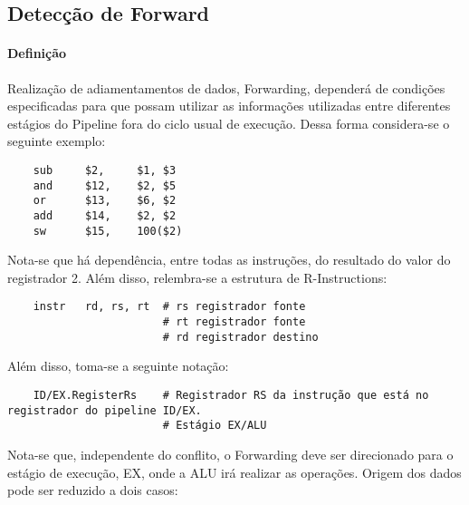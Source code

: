 \documentclass{article}
\begin{document}
\subsection{Detecção de Forward}
\paragraph{Definição}Realização de adiamentamentos de dados, Forwarding, dependerá de condições especificadas para que possam utilizar as informações utilizadas entre diferentes estágios do Pipeline fora do ciclo usual de execução. Dessa forma considera-se o seguinte exemplo:
\begin{scriptsize}
    \myStyleRISCV
    \begin{lstlisting}
    sub     $2,     $1, $3
    and     $12,    $2, $5
    or      $13,    $6, $2
    add     $14,    $2, $2
    sw      $15,    100($2)
    \end{lstlisting}
\end{scriptsize}
\noindent Nota-se que há dependência, entre todas as instruções, do resultado do valor do registrador 2. Além disso, relembra-se a estrutura de R-Instructions:
\begin{scriptsize}
    \myStyleRISCV
    \begin{lstlisting}
    instr   rd, rs, rt  # rs registrador fonte
                        # rt registrador fonte
                        # rd registrador destino
    \end{lstlisting}
\end{scriptsize}
\noindent Além disso, toma-se a seguinte notação:
\begin{scriptsize}
    \myStyleRISCV
    \begin{lstlisting}
    ID/EX.RegisterRs    # Registrador RS da instrução que está no registrador do pipeline ID/EX.
                        # Estágio EX/ALU
    \end{lstlisting}
\end{scriptsize}
\noindent Nota-se que, independente do conflito, o Forwarding deve ser direcionado para o estágio de execução, EX, onde a ALU irá realizar as operações. Origem dos dados pode ser reduzido a dois casos:
\end{document}
